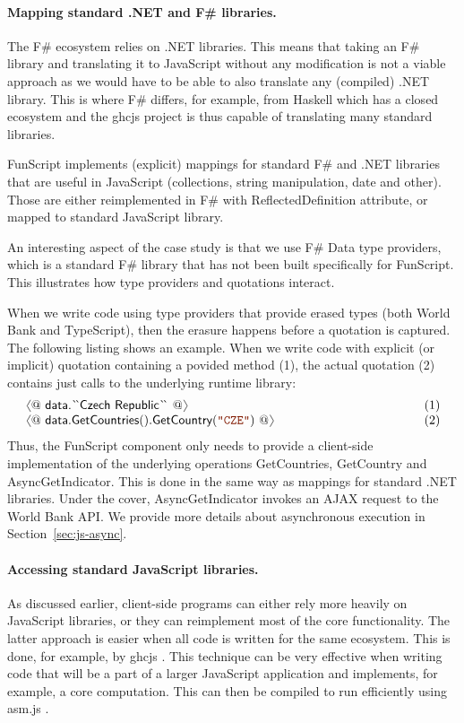 \documentclass[submission,copyright,creativecommons]{eptcs}
\newcommand{\langl}{\begin{picture}(4.5,7)
\put(1.1,2.5){\rotatebox{60}{\line(1,0){5.5}}}
\put(1.1,2.5){\rotatebox{300}{\line(1,0){5.5}}}
\end{picture}}
\newcommand{\rangl}{\begin{picture}(4.5,7)
\put(.9,2.5){\rotatebox{120}{\line(1,0){5.5}}}
\put(.9,2.5){\rotatebox{240}{\line(1,0){5.5}}}
\end{picture}}
\newcommand{\str}[1]{\textnormal{\textcolor{strclr}{\ttfamily "#1"}}}
\newcommand{\ident}[1]{\textnormal{\sffamily #1}}
\newcommand{\lident}[1]{\textnormal{\sffamily 
  \`{}\hspace{-0.25em}\`{}\hspace{-0.1em}#1\`{}\hspace{-0.25em}\`{}}}
\begin{document}
\paragraph{Mapping standard .NET and F\# libraries.}
The F\# ecosystem relies on .NET libraries. This means that taking an F\# library and translating it 
to JavaScript without any modification is not a viable approach as we would have to be able to also
translate any (compiled) .NET library. This is where F\# differs, for example, from Haskell which has
a closed ecosystem and the ghcjs project \cite{haskell-ghcjs} is thus capable of translating many 
standard libraries.

FunScript implements (explicit) mappings for standard F\# and .NET libraries that are useful in 
JavaScript (collections, string manipulation, date and other). Those are either reimplemented in
F\# with \ident{ReflectedDefinition} attribute, or mapped to standard JavaScript library.

An interesting aspect of the case study is that we use F\# Data \cite{fsharp-data} type providers, 
which is a standard F\# library that has not been built specifically for FunScript. This illustrates 
how type providers and quotations interact. 

When we write code using type providers that provide erased types (both World Bank and TypeScript), 
then the erasure happens before a quotation is captured. The following listing shows an example. 
When we write code with explicit (or implicit) quotation containing a povided method (1), the actual 
quotation (2) contains just calls to the underlying runtime library:
%
\begin{equation*}
\begin{array}{llr}
 \langl @~\ident{data.}\lident{Czech Republic}~@\rangl &\hspace{10em}& (1)\\
 \langl @~\ident{data.GetCountries}().\ident{GetCountry}(\str{CZE}) ~@\rangl  && (2)
\end{array}
\end{equation*}
%
Thus, the FunScript component only needs to provide a client-side implementation of the underlying
operations \ident{GetCountries}, \ident{GetCountry} and \ident{AsyncGetIndicator}. This is done in the
same way as mappings for standard .NET libraries. Under the cover, \ident{AsyncGetIndicator} invokes
an AJAX request to the World Bank API. We provide more details about asynchronous execution in 
Section~\ref{sec:js-async}.

\paragraph{Accessing standard JavaScript libraries.}
As discussed earlier, client-side programs can either rely more heavily on JavaScript libraries,
or they can reimplement most of the core functionality. The latter approach is easier when all code
is written for the same ecosystem. This is done, for example, by ghcjs \cite{haskell-ghcjs}.
This technique can be very effective when writing code that will be a part of a larger JavaScript
application and implements, for example, a core computation. This can then be compiled to run
efficiently using asm.js \cite{asm-js}.
\end{document}
